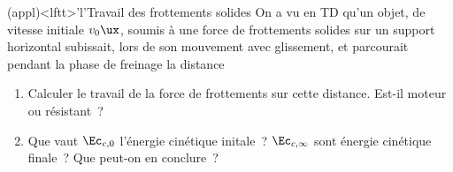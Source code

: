 \documentclass[../../main/main.tex]{subfiles}
\begin{document}
\begin{tcb*}(appl)<lftt>'l'{Travail des frottements solides}
	On a vu en TD qu'un objet, de vitesse initiale $v_0\ux$, soumis à une force
	de frottements solides sur un support horizontal subissait, lors de son
	mouvement avec glissement,
	\psw{
		\[\Tf = -fmg\ux\]
	}
	et parcourait pendant la phase de freinage la distance
	\psw{
	\[D = \frac{v_0{}^2}{2fg}\]
	}
	\begin{enumerate}[label=\sqenumi]
		\item Calculer le travail de la force de frottements sur cette distance.
		      Est-il moteur ou résistant~?
		\item Que vaut $\Ec_{c,0}$ l'énergie cinétique initale~? $\Ec_{c,\infty}$
		      sont énergie cinétique finale~? Que peut-on en conclure~?
	\end{enumerate}
	\tcblower
	\begin{enumerate}[label=\sqenumi]
		\mitem {}
		\mitem {}
	\end{enumerate}
\end{tcb*}
\end{document}
